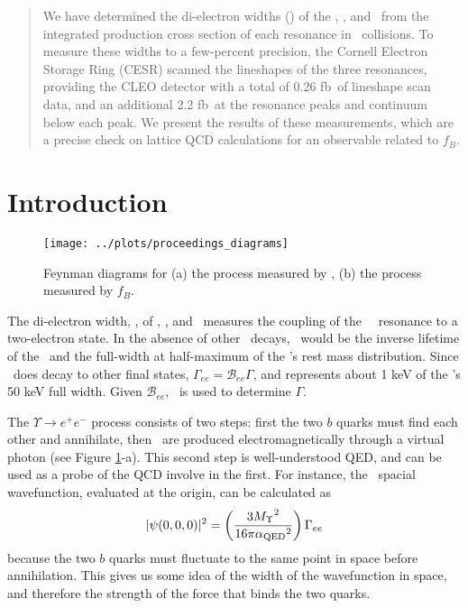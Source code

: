 \documentclass[aps,prd,preprint,superscriptaddress,tightenlines,nofootinbib,floatfix]{revtex4}
\begin{document}
\begin{abstract} 
We have determined the di-electron widths (\gee) of the \uone, \utwo,
and \uthree\ from the integrated production cross section of each
resonance in \ee\ collisions.  To measure these widths to a
few-percent precision, the Cornell Electron Storage Ring (CESR)
scanned the lineshapes of the three resonances, providing the CLEO
detector with a total of 0.26 fb\inv\ of lineshape scan data, and an
additional 2.2 fb\inv\ at the resonance peaks and continuum below each
peak.  We present the results of these measurements, which are a
precise check on lattice QCD calculations for an observable related to
$f_B$.
\end{abstract}
\maketitle

%
\section{Introduction}
%

\begin{figure}[t]
  \begin{center}
    \texttt{[image: ../plots/proceedings\_diagrams]}
  \end{center}
  \caption{\label{fig:diagrams} Feynman diagrams for (a) the process
  measured by \gee, (b) the process measured by $f_B$.}
\end{figure}

The di-electron width, \gee, of \uone, \utwo, and \uthree\ measures
the coupling of the \ups\ \bbar\ resonance to a two-electron state.
In the absence of other \ups\ decays, \gee\ would be the inverse
lifetime of the \ups\ and the full-width at half-maximum of the \ups's
rest mass distribution.  Since \ups\ does decay to other final states,
$\Gamma_{ee} = \mathcal{B}_{ee} \Gamma$, and represents about 1 keV of
the \ups's 50 keV full width.  Given $\mathcal{B}_{ee}$, \gee\ is used
to determine $\Gamma$.

The $\Upsilon \to e^+e^-$ process consists of two steps: first the two
$b$ quarks must find each other and annihilate, then \ee\ are produced
electromagnetically through a virtual photon (see Figure
\ref{fig:diagrams}-a).  This second step is well-understood QED, and
can be used as a probe of the QCD involve in the first.  For instance,
the \bbar\ spacial wavefunction, evaluated at the origin, can be
calculated as
\begin{equation}
  |\psi(0,0,0)|^2 = \left(\frac{3 {M_\Upsilon}^2}{16 \pi
   {\alpha_{\mbox{\scriptsize QED}}}^2} \right) \Gamma_{ee}
\end{equation}
because the two $b$ quarks must fluctuate to the same point in space
before annihilation.  This gives us some idea of the width of the
wavefunction in space, and therefore the strength of the force that
binds the two quarks.
\end{document}
